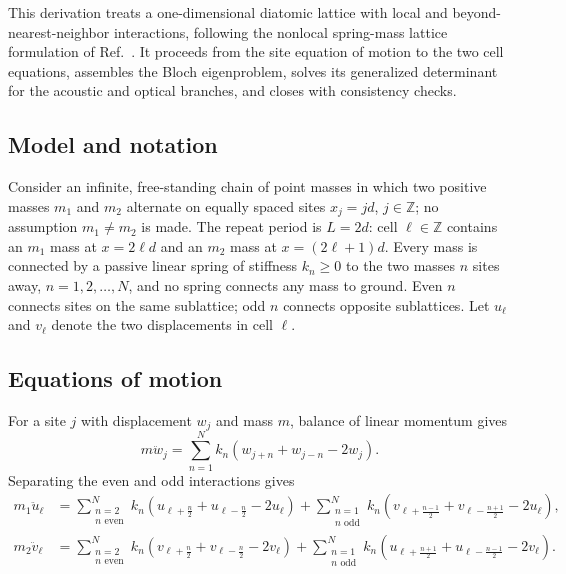 
This derivation treats a one-dimensional diatomic lattice with local and
beyond-nearest-neighbor interactions, following the nonlocal spring-mass lattice
formulation of Ref.~\cite{kazemi2023drawing}. It proceeds from the site equation
of motion to the two cell equations, assembles the Bloch eigenproblem, solves its
generalized determinant for the acoustic and optical branches, and closes with
consistency checks.

\subsection{Model and notation}

Consider an infinite, free-standing chain of point masses in which two positive
masses $m_1$ and $m_2$ alternate on equally spaced sites $x_j=jd$,
$j\in\mathbb{Z}$; no assumption $m_1\neq m_2$ is made. The repeat period is
$L=2d$: cell $\ell\in\mathbb{Z}$ contains an $m_1$ mass at $x=2\ell d$ and an
$m_2$ mass at $x=(2\ell+1)d$. Every mass is connected by a passive linear spring
of stiffness $k_n\geq0$ to the two masses $n$ sites away,
$n=1,2,\ldots,N$, and no spring connects any mass to ground. Even $n$ connects
sites on the same sublattice; odd $n$ connects opposite sublattices. Let
$u_\ell$ and $v_\ell$ denote the two displacements in cell $\ell$.

\subsection{Equations of motion}

For a site $j$ with displacement $w_j$ and mass $m$, balance of linear momentum
gives
\begin{equation}
    m\ddot{w}_j=\sum_{n=1}^{N}k_n
    \left(w_{j+n}+w_{j-n}-2w_j\right).
    \label{eq:site}
\end{equation}
Separating the even and odd interactions gives
\begin{align}
    m_1\ddot{u}_\ell
    &=\sum_{\substack{n=2\\\text{$n$ even}}}^{N}k_n
      \left(u_{\ell+\frac n2}+u_{\ell-\frac n2}-2u_\ell\right)
      +\sum_{\substack{n=1\\\text{$n$ odd}}}^{N}k_n
      \left(v_{\ell+\frac{n-1}{2}}+v_{\ell-\frac{n+1}{2}}-2u_\ell\right),
      \label{eq:cellA}\\
    m_2\ddot{v}_\ell
    &=\sum_{\substack{n=2\\\text{$n$ even}}}^{N}k_n
      \left(v_{\ell+\frac n2}+v_{\ell-\frac n2}-2v_\ell\right)
      +\sum_{\substack{n=1\\\text{$n$ odd}}}^{N}k_n
      \left(u_{\ell+\frac{n+1}{2}}+u_{\ell-\frac{n-1}{2}}-2v_\ell\right).
      \label{eq:cellB}
\end{align}

